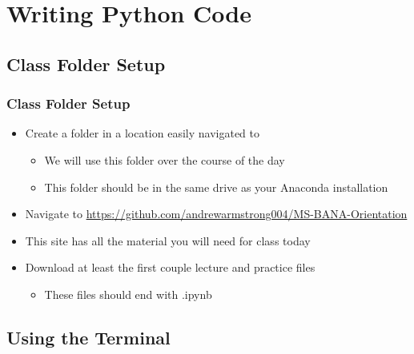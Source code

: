 \documentclass[mini frame in current subsection]{beamer}
\begin{document}
\section{Writing Python Code}

	\subsection{Class Folder Setup}
	
		\begin{frame}
			\frametitle{Class Folder Setup}
			
			\begin{itemize}
				\vfill\item  Create a folder in a location easily navigated to
					\begin{itemize}
						\item  We will use this folder over the course of the day
						\item  This folder should be in the same drive as your Anaconda installation
					\end{itemize}
				\vfill\item  Navigate to \url{https://github.com/andrewarmstrong004/MS-BANA-Orientation}
				\vfill\item  This site has all the material you will need for class today
				\vfill\item  Download at least the first couple lecture and practice files
					\begin{itemize}
						\item  These files should end with .ipynb
					\end{itemize}
			\end{itemize}
			
		\end{frame}
	\subsection{Using the Terminal}
	
\end{document}
